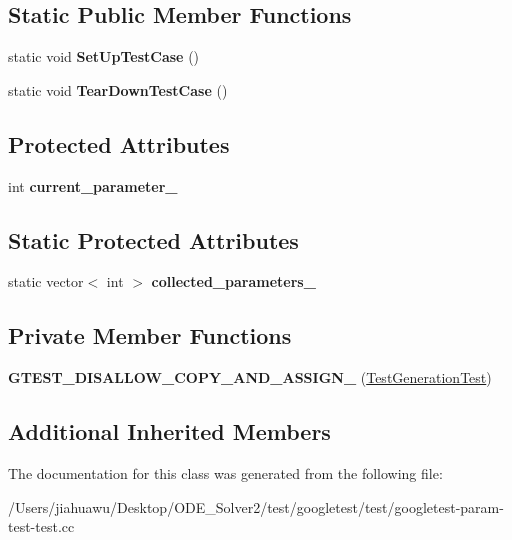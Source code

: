 \subsection*{Static Public Member Functions}
\begin{DoxyCompactItemize}
\item 
\mbox{\label{class_test_generation_test_a3e1681e93e14b17fe923e763d88940cb}} 
static void {\bfseries Set\+Up\+Test\+Case} ()
\item 
\mbox{\label{class_test_generation_test_ab0f077f3b881d66e3676741761222732}} 
static void {\bfseries Tear\+Down\+Test\+Case} ()
\end{DoxyCompactItemize}
\subsection*{Protected Attributes}
\begin{DoxyCompactItemize}
\item 
\mbox{\label{class_test_generation_test_a2d149b987b6dfe86ffbfae677199b0cd}} 
int {\bfseries current\+\_\+parameter\+\_\+}
\end{DoxyCompactItemize}
\subsection*{Static Protected Attributes}
\begin{DoxyCompactItemize}
\item 
\mbox{\label{class_test_generation_test_a16dfa6f4b445c7e4a7a9611b34b7a7a2}} 
static vector$<$ int $>$ {\bfseries collected\+\_\+parameters\+\_\+}
\end{DoxyCompactItemize}
\subsection*{Private Member Functions}
\begin{DoxyCompactItemize}
\item 
\mbox{\label{class_test_generation_test_a896a79483bc30b0e0c39716ab17da8f1}} 
{\bfseries G\+T\+E\+S\+T\+\_\+\+D\+I\+S\+A\+L\+L\+O\+W\+\_\+\+C\+O\+P\+Y\+\_\+\+A\+N\+D\+\_\+\+A\+S\+S\+I\+G\+N\+\_\+} (\mbox{\hyperlink{class_test_generation_test}{Test\+Generation\+Test}})
\end{DoxyCompactItemize}
\subsection*{Additional Inherited Members}


The documentation for this class was generated from the following file\+:\begin{DoxyCompactItemize}
\item 
/\+Users/jiahuawu/\+Desktop/\+O\+D\+E\+\_\+\+Solver2/test/googletest/test/googletest-\/param-\/test-\/test.\+cc\end{DoxyCompactItemize}
